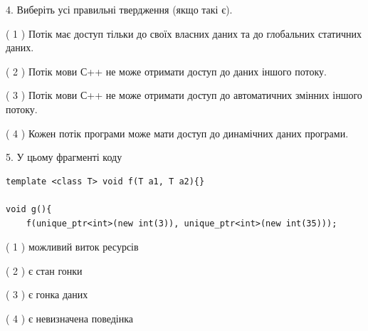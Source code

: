 \documentclass[12pt, ukrainian]{article}
\begin{document}
\begin {large}
{%
4. Виберіть усі правильні твердження (якщо такі є).\par
\vspace{2mm}

( 1 ) Потік має доступ тільки до своїх власних даних та до глобальних статичних даних.%

( 2 ) Потік мови С++ не може отримати доступ до даних іншого потоку.%

( 3 ) Потік мови С++ не може отримати доступ до автоматичних змінних іншого потоку.%

( 4 ) Кожен потік програми може мати доступ до динамічних даних програми.%


5. У цьому фрагменті коду
\begin{verbatim}
template <class T> void f(T a1, T a2){}

void g(){
    f(unique_ptr<int>(new int(3)), unique_ptr<int>(new int(35)));
\end{verbatim}

( 1 ) можливий виток ресурсів%

( 2 ) є стан гонки%

( 3 ) є гонка даних%

( 4 ) є невизначена поведінка%
}
\end {large}
\end{document}
